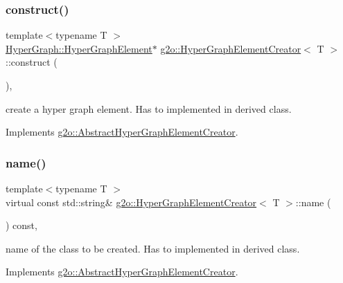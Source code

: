 \subsubsection{\texorpdfstring{construct()}{construct()}}
{\footnotesize\ttfamily template$<$typename T $>$ \\
\mbox{\hyperlink{structg2o_1_1_hyper_graph_1_1_hyper_graph_element}{Hyper\+Graph\+::\+Hyper\+Graph\+Element}}$\ast$ \mbox{\hyperlink{classg2o_1_1_hyper_graph_element_creator}{g2o\+::\+Hyper\+Graph\+Element\+Creator}}$<$ T $>$\+::construct (\begin{DoxyParamCaption}{ }\end{DoxyParamCaption})\hspace{0.3cm}{\ttfamily [inline]}, {\ttfamily [virtual]}}

create a hyper graph element. Has to implemented in derived class. 

Implements \mbox{\hyperlink{classg2o_1_1_abstract_hyper_graph_element_creator_a0b4722fa4b05465bf89d6e7fdc75b153}{g2o\+::\+Abstract\+Hyper\+Graph\+Element\+Creator}}.

\mbox{\label{classg2o_1_1_hyper_graph_element_creator_a9350df173e72ccb4bb6594d282a2c0e7}} 
\subsubsection{\texorpdfstring{name()}{name()}}
{\footnotesize\ttfamily template$<$typename T $>$ \\
virtual const std\+::string\& \mbox{\hyperlink{classg2o_1_1_hyper_graph_element_creator}{g2o\+::\+Hyper\+Graph\+Element\+Creator}}$<$ T $>$\+::name (\begin{DoxyParamCaption}{ }\end{DoxyParamCaption}) const\hspace{0.3cm}{\ttfamily [inline]}, {\ttfamily [virtual]}}

name of the class to be created. Has to implemented in derived class. 

Implements \mbox{\hyperlink{classg2o_1_1_abstract_hyper_graph_element_creator_a238928fbbfd6e473b2c61002112e6f5f}{g2o\+::\+Abstract\+Hyper\+Graph\+Element\+Creator}}.



